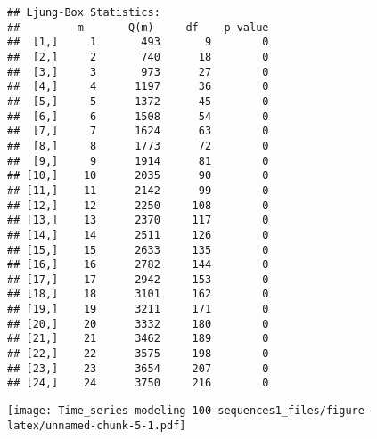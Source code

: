 \documentclass[
]{article}
\newenvironment{Shaded}{\begin{snugshade}}{\end{snugshade}}
\newcommand{\AttributeTok}[1]{\textcolor[rgb]{0.13,0.29,0.53}{#1}}
\newcommand{\CommentTok}[1]{\textcolor[rgb]{0.56,0.35,0.01}{\textit{#1}}}
\newcommand{\DecValTok}[1]{\textcolor[rgb]{0.00,0.00,0.81}{#1}}
\newcommand{\FunctionTok}[1]{\textcolor[rgb]{0.13,0.29,0.53}{\textbf{#1}}}
\newcommand{\NormalTok}[1]{#1}
\newcommand{\OtherTok}[1]{\textcolor[rgb]{0.56,0.35,0.01}{#1}}
\newcommand{\SpecialCharTok}[1]{\textcolor[rgb]{0.81,0.36,0.00}{\textbf{#1}}}
\newcommand{\StringTok}[1]{\textcolor[rgb]{0.31,0.60,0.02}{#1}}
\begin{document}
\begin{Shaded}
\end{Shaded}

\begin{verbatim}
## Ljung-Box Statistics:  
##         m       Q(m)     df    p-value
##  [1,]     1       493       9        0
##  [2,]     2       740      18        0
##  [3,]     3       973      27        0
##  [4,]     4      1197      36        0
##  [5,]     5      1372      45        0
##  [6,]     6      1508      54        0
##  [7,]     7      1624      63        0
##  [8,]     8      1773      72        0
##  [9,]     9      1914      81        0
## [10,]    10      2035      90        0
## [11,]    11      2142      99        0
## [12,]    12      2250     108        0
## [13,]    13      2370     117        0
## [14,]    14      2511     126        0
## [15,]    15      2633     135        0
## [16,]    16      2782     144        0
## [17,]    17      2942     153        0
## [18,]    18      3101     162        0
## [19,]    19      3211     171        0
## [20,]    20      3332     180        0
## [21,]    21      3462     189        0
## [22,]    22      3575     198        0
## [23,]    23      3654     207        0
## [24,]    24      3750     216        0
\end{verbatim}

\texttt{[image: Time\_series-modeling-100-sequences1\_files/figure-latex/unnamed-chunk-5-1.pdf]}
\end{document}
